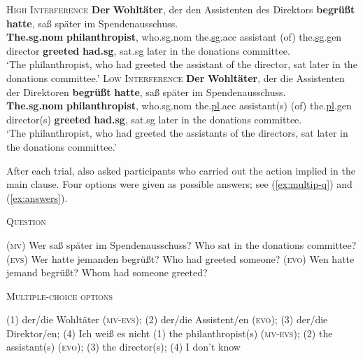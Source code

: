 \documentclass{cambridge7A}\usepackage[]{graphicx}\usepackage[]{color}
\begin{document}
\begin{exe}
    \ex  \label{ex:exp1}
    \begin{xlist}
        \ex \textsc{High Interference} \label{ex:HI}
        \gll \textbf{Der} \textbf{Wohltäter}, der den Assistenten {} des
        Direktors \textbf{begrüßt} \textbf{hatte}, saß später im
        Spendenausschuss.\\
        \textbf{The.sg.nom} \textbf{philanthropist}, who.sg.nom
        the.\underline{sg}.acc assistant (of) the.\underline{sg}.gen director
        \textbf{greeted} \textbf{had.sg}, sat.sg {later} {in the} {donations
        committee}.\\
        \glt ‘The philanthropist, who had greeted the assistant of the director,
        sat later in the donations committee.'
        \ex \textsc{Low Interference} \label{ex:LI}
        \gll \textbf{Der} \textbf{Wohltäter}, der die Assistenten {} der
        Direktoren  \textbf{begrüßt} \textbf{hatte}, saß später im
        Spendenausschuss.\\
        \textbf{The.sg.nom} \textbf{philanthropist}, who.sg.nom
        the.\underline{pl}.acc assistant(s) (of) the.\underline{pl}.gen
        director(s) \textbf{greeted} \textbf{had.sg}, sat.sg {later} {in the}
        {donations committee}.\\
        \glt ‘The philanthropist, who had greeted the assistants of the
        directors, sat later in the donations committee.'
    \end{xlist}
\end{exe}

After each trial, \cite{nicenboimexploratory} also asked participants who carried out the action implied in the main clause. Four options were given  as possible answers; see (\ref{ex:multip-q}) and (\ref{ex:answers}).

\begin{exe}
    \ex  \textsc{Question} \label{ex:multip-q}
    \begin{xlist}
        \ex \textsc{(mv)} Wer saß später im Spendenausschuss? 
        \glt Who sat in the donations committee? 
        \ex \textsc{(evs)}  Wer hatte jemanden begrüßt? 
        \glt Who had greeted someone?
        \ex \textsc{(evo)}  Wen hatte jemand begrüßt? 
        \glt Whom had someone greeted?
    \end{xlist}

    \ex  \textsc{Multiple-choice options} \label{ex:answers}
    \begin{xlist}
        \ex (1) der/die Wohltäter \textsc{(mv-evs)}; (2) der/die Assistent/en \textsc{(evo)};
        (3) der/die Direktor/en; (4) Ich weiß es nicht
        \glt (1) the philanthropist(s) \textsc{(mv-evs)}; (2) the assistant(s) \textsc{(evo)}; (3)
        the director(s); (4) I don't know
    \end{xlist}
\end{exe}
\end{document}
